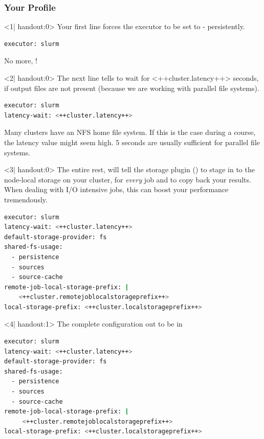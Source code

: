 \begin{frame}[fragile]
  \frametitle{Your Profile}
    \begin{onlyenv}<1| handout:0>
      Your first line forces the executor to be set to \slurm - persistently.
      \begin{lstlisting}[language=Bash, style=Shell]
executor: slurm
     \end{lstlisting}
     No more, !
   \end{onlyenv}
   \begin{onlyenv}<2| handout:0>
   	 The next line tells \Snakemake to wait for <++cluster.latency++> seconds, if output files are not present (because we are working with parallel file systems). 
   	 \begin{lstlisting}[language=Bash, style=Shell]
executor: slurm
latency-wait: <++cluster.latency++>
   	 \end{lstlisting}
      \begin{warning}
      	Many clusters have an NFS home file system. If this is the case during a course, the latency value might seem high. 5 seconds are usually sufficient for parallel file systems.
      \end{warning}
    \end{onlyenv}
    \begin{onlyenv}<3| handout:0>
      The entire rest, will tell the storage plugin () to stage in to the node-local storage on your cluster, for \emph{every} job and to copy back your results. When dealing with I/O intensive jobs, this can boost your performance tremendously. 
      \begin{lstlisting}[language=Bash, style=Shell]
executor: slurm
latency-wait: <++cluster.latency++>
default-storage-provider: fs
shared-fs-usage:
  - persistence
  - sources
  - source-cache
remote-job-local-storage-prefix: |
    <++cluster.remotejoblocalstorageprefix++>
local-storage-prefix: <++cluster.localstorageprefix++>
    \end{lstlisting}
   \end{onlyenv}
   \begin{onlyenv}<4| handout:1>
   	The complete configuration out to be in 
   	\begin{lstlisting}[language=Bash, style=Shell]
executor: slurm
latency-wait: <++cluster.latency++>
default-storage-provider: fs
shared-fs-usage:
  - persistence
  - sources
  - source-cache
remote-job-local-storage-prefix: |
     <++cluster.remotejoblocalstorageprefix++>
local-storage-prefix: <++cluster.localstorageprefix++>
    \end{lstlisting}
  \end{onlyenv}
\end{frame}

